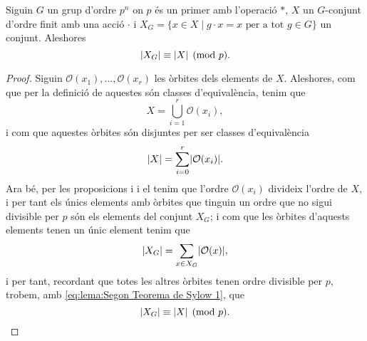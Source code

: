 \documentclass[../Apunts.tex]{subfiles}
\begin{document}
	\begin{lemma}
		\label{lema:Segon Teorema de Sylow}
		Siguin \(G\) un grup d'ordre \(p^{n}\) on \(p\) és un primer amb l'operació \(\ast\), \(X\) un \(G\)-conjunt d'ordre finit amb una acció \(\cdot\) i \(X_{G}=\{x\in X\mid g\cdot x=x\text{ per a tot }g\in G\}\) un conjunt. Aleshores
		\[\abs{X_{G}}\equiv\abs{X}\pmod{p}.\]
		\begin{proof}
			Siguin \(\mathcal{O}(x_{1}),\dots,\mathcal{O}(x_{r})\) les òrbites dels elements de \(X\). Aleshores, com que per la definició de  aquestes són classes d'equivalència, tenim que %
			\[X=\bigcup_{i=1}^{r}\mathcal{O}(x_{i}),\]
			i com que aquestes òrbites són disjuntes per ser classes d'equivalència
			\begin{equation}
		\label{eq:lema:Segon Teorema de Sylow 1}
			\abs{X}=\sum_{i=0}^{r}\abs{\mathcal{O}(x_{i})}.
			\end{equation}
			Ara bé, per les proposicions  i  i el  tenim que l'ordre \(\mathcal{O}(x_{i})\) divideix l'ordre de \(X\), i per tant els únics elements amb òrbites que tinguin un ordre que no sigui divisible per \(p\) són els elements del conjunt \(X_{G}\); i com que les òrbites d'aquests elements tenen un únic element tenim que
			\[\abs{X_{G}}=\sum_{x\in X_{G}}\abs{\mathcal{O}(x)},\]
			i per tant, recordant que totes les altres òrbites tenen ordre divisible per \(p\), trobem, amb \eqref{eq:lema:Segon Teorema de Sylow 1}, que
			\[\abs{X_{G}}\equiv\abs{X}\pmod{p}.\qedhere\]
		\end{proof}
	\end{lemma}
\end{document}
